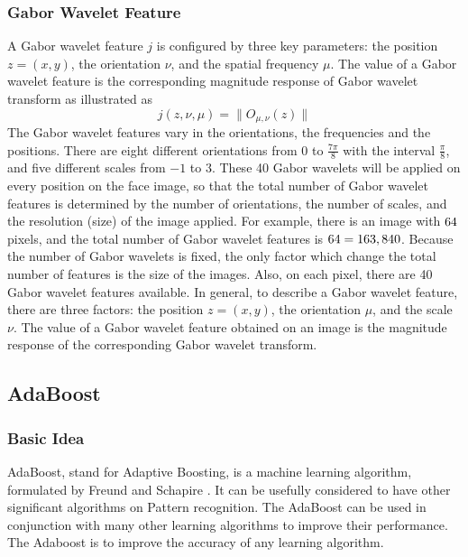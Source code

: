 \subsubsection{Gabor Wavelet Feature}
\label{sec:gaborwaveletfeature}
A Gabor wavelet feature $j$ is configured by three key parameters: the position $z = (x,y)$, the orientation $\nu$, and the spatial frequency $\mu$. The value of a Gabor wavelet feature is the corresponding magnitude response of Gabor wavelet transform as illustrated as
\begin{equation}\label{eq:gaborfeature}
 j(z,\nu,\mu) =  \|O_{\mu,\nu}(z)\|
\end{equation}
The Gabor wavelet features vary in  the orientations, the frequencies and the positions. There are eight different orientations from $0$ to $\frac{7\pi}{8}$ with the interval $\frac{\pi}{8}$, and five different scales from $-1$ to $3$.  These 40 Gabor wavelets will be applied on every position on the face image, so that the total number of Gabor wavelet features is determined by the number of orientations, the number of scales, and the resolution (size) of the image  applied. For example, there is an image with $64\time64$ pixels, and the total number of Gabor wavelet features is $64\time64\time5\time8=163,840$. Because the number of Gabor wavelets is fixed, the only factor which change the total number of features is the size of the images. Also, on each pixel, there are 40 Gabor wavelet features available.  In general, to describe a Gabor wavelet feature, there are three factors: the position $z=(x,y)$, the orientation $\mu$, and the scale $\nu$.  The value of a Gabor wavelet feature obtained on an image is the magnitude response of the corresponding Gabor wavelet transform.


\subsection{AdaBoost}
\label{sec:faceveri:adaboost}
\subsubsection{Basic Idea}
AdaBoost, stand for Adaptive Boosting, is a machine learning algorithm, formulated by Freund and Schapire \cite{Freund1995,Freund1999,Schapire1999}. It can be usefully considered to have other significant algorithms on Pattern recognition. The AdaBoost can be used in conjunction with many other learning algorithms to improve their performance.  The Adaboost is to improve the accuracy of any learning algorithm.
